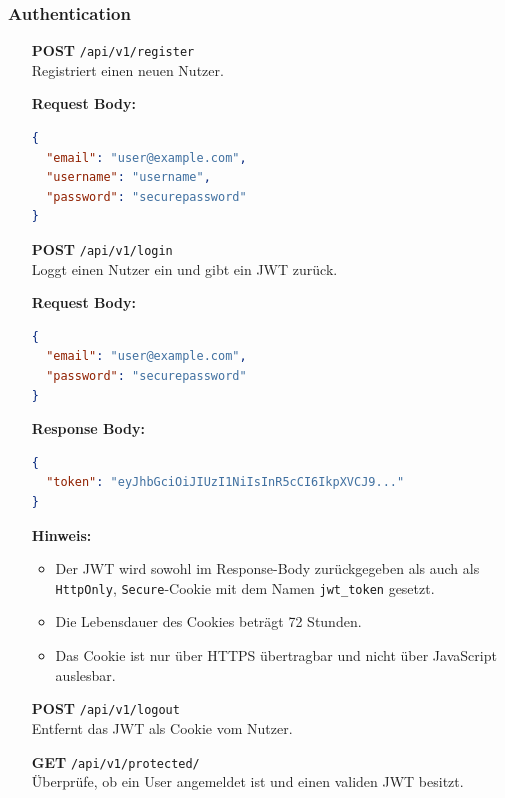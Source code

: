 \documentclass[11pt,a4paper]{article}
\begin{document}
\subsubsection{Authentication}

\begin{itemize}[leftmargin=1.5cm]
    \item[\textbf{POST}] \texttt{/api/v1/register} \\
    Registriert einen neuen Nutzer.

    \textbf{Request Body:}
    \begin{lstlisting}[language=json]
{
  "email": "user@example.com",
  "username": "username",
  "password": "securepassword"
}
    \end{lstlisting}

\item[\textbf{POST}] \texttt{/api/v1/login} \\
Loggt einen Nutzer ein und gibt ein JWT zurück.

\textbf{Request Body:}
\begin{lstlisting}[language=json]
{
  "email": "user@example.com",
  "password": "securepassword"
}
\end{lstlisting}

\textbf{Response Body:}
\begin{lstlisting}[language=json]
{
  "token": "eyJhbGciOiJIUzI1NiIsInR5cCI6IkpXVCJ9..."
}
\end{lstlisting}

\textbf{Hinweis:}
\begin{itemize}
  \item Der JWT wird sowohl im Response-Body zurückgegeben als auch als \texttt{HttpOnly}, \texttt{Secure}-Cookie mit dem Namen \texttt{jwt\_token} gesetzt.
  \item Die Lebensdauer des Cookies beträgt 72 Stunden.
  \item Das Cookie ist nur über HTTPS übertragbar und nicht über JavaScript auslesbar.
\end{itemize}

    \item[\textbf{POST}] \texttt{/api/v1/logout} \\
    Entfernt das JWT als Cookie vom Nutzer.

\item[\textbf{GET}] \texttt{/api/v1/protected/} \\
Überprüfe, ob ein User angemeldet ist und einen validen JWT besitzt.
\end{itemize}
\end{document}
